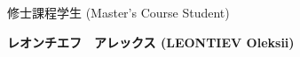 \documentclass[a4j,twocolumn]{jarticle}
\begin{document}


修士課程学生 (Master's Course Student)



{\bf レオンチエフ　アレックス (LEONTIEV Oleksii)}

%
%
%
%
\end{document}
